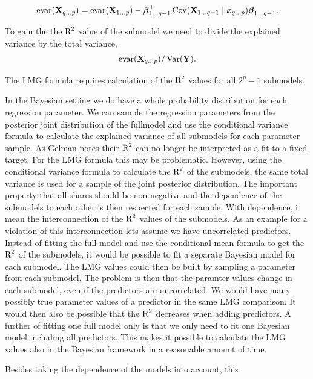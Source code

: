\documentclass[11pt,a4paper,twoside]{book}\usepackage[]{graphicx}\usepackage[]{color}
\begin{document}
       \begin{align} 
       \text{evar}({\mathbf{X}}_{q \dots p}) =  \text{evar}({\mathbf{X}}_{1  \dots p}) - {\boldsymbol{\beta}}^\top_{1 \dots q-1} \operatorname{Cov}({\mathbf{X}}_{1\dots {q-1}} \mid {\textbf{\textit{x}}}_{q \dots p}) {\boldsymbol{\beta}}_{1 \dots {q-1}}.
   \end{align}

To gain the the $\text{R}^2$ value of the submodel we need to divide the explained variance by the total variance,
       \begin{align} 
\text{evar}({\mathbf{X}}_{q \dots p}) / \operatorname{Var}({\mathbf{Y}}).   
\end{align}

The LMG formula requires calculation of the $\text{R}^2$ values for all $2^p-1$ submodels. 

In the Bayesian setting we do have a whole probability distribution for each regression parameter. We can sample the regression parameters from the posterior joint distribution of the fullmodel and use the conditional variance formula to calculate the explained variance of all submodels for each parameter sample. As Gelman notes their $\text{R}^2$ can no longer be interpreted as a fit to a fixed target. For the LMG formula this may be problematic. However, using the conditional variance formula to calculate the $\text{R}^2$ of the submodels, the same total variance is used for a sample of the joint posterior distribution. The important property that all shares should be non-negative and the dependence of the submodels to each other is then respected for each sample. With dependence, i mean the interconnection of the $\text{R}^2$ values of the submodels. As an example for a violation of this interconnection lets assume we have uncorrelated predictors. Instead of fitting the full model and use the conditional mean formula to get the $\text{R}^2$ of the submodels,  it would be possible to fit a separate Bayesian model for each submodel. The LMG values could then be built by sampling a parameter from each submodel. The problem is then that the paramter values change in each submodel, even if the predictors are uncorrelated. We would have many possibly true parameter values of a predictor in the same LMG comparison. It would then also be possible that the $\text{R}^2$ decreases when adding predictors.  
A further of fitting one full model only  is that we only need to fit one Bayesian model including all predictors. This makes it possible to calculate the LMG values also in the Bayesian framework in a reasonable amount of time. 






Besides taking the dependence of the models into account, this 
\end{document}
